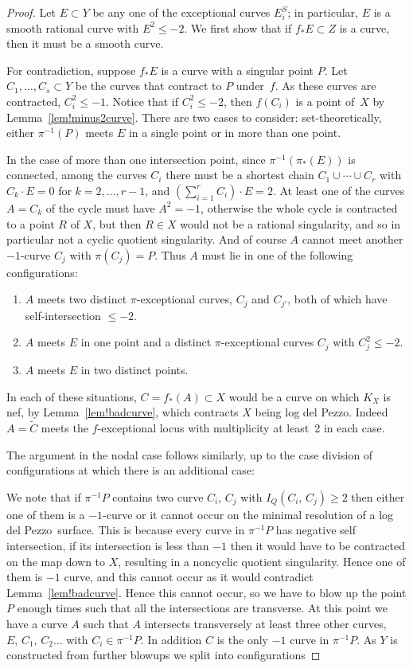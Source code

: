 \documentclass[11pt]{amsbook}
\theoremstyle{plain}
\newcommand{\ldp}{log del Pezzo}
\newcommand{\wt}[1]{\widetilde #1}
\begin{document}
\begin{proof}
Let $E\subset Y$ be any one of the exceptional curves $E_i^S$; in particular, $E$ is
a smooth rational curve with $E^2 \le-2$.
We first show that if $f_* E\subset Z$ is a curve, then it must be a smooth curve. 

For contradiction, suppose $f_*E$ is a curve with a singular point $P$.
Let $C_1,\dots,C_s\subset Y$ be the curves that contract to $P$ under~$f$.
As these curves are contracted, $C_i^2 \leq  -1$.
Notice that if $C_i^2\le-2$, then $f(C_i)$ is a point of~$X$
by Lemma~\ref{lem!minus2curve}.
There are two cases to consider: set-theoretically, either
$\pi^{-1}(P)$ meets $E$ in a single point or in more than one point.


In the case of more than one intersection point, since $\pi^{-1}(\pi_*(E))$ is connected,
among the curves $C_i$ there must be a shortest chain $C_1\cup\cdots\cup C_r$
with $C_k\cdot E=0$ for $k=2,\dots,r-1$, and $\left(\sum_{i=1}^r C_i\right)\cdot E = 2$.
At least one of the curves $A=C_k$ of the cycle must have $A^2=-1$, otherwise the
whole cycle is contracted to a point $R$ of $X$, but then $R\in X$ would not be
a rational singularity, and so in particular not a cyclic quotient singularity.
And of course $A$ cannot meet another $-1$-curve $C_j$ with $\pi(C_j)=P$.
Thus $A$ must lie in one of the following configurations:
\begin{enumerate}
\item
$A$ meets two distinct $\pi$-exceptional curves, $C_j$ and $C_{j'}$,
both of which have self-intersection $\le-2$.
\item
$A$ meets $E$ in one point and a distinct $\pi$-exceptional curves $C_j$
with $C_j^2\le-2$.
\item
$A$ meets $E$ in two distinct points.
\end{enumerate}
In each of these situations, $C = f_*(A)\subset X$ would be a curve
on which $K_X$ is nef, by Lemma~\ref{lem!badcurve}, which contracts
$X$ being \ldp. Indeed $A = \wt C$ meets the $f$-exceptional locus with multiplicity
at least~2 in each case.

The argument in the nodal case follows similarly, up to the case division of configurations
at which there is an additional case:

We note that if $\pi^{-1}{P}$ contains two curve $C_i$, $C_j$ with $I_Q (C_i, \, C_j) \ge 2$ then either one of them is a $-1$-curve or it cannot occur on the minimal resolution of a \ldp\ surface. This is because every curve in $\pi^{-1}{P}$ has negative self intersection, if its intersection is less than $-1$ then it would have to be contracted on the map down to $X$, resulting in a noncyclic quotient singularity. Hence one of them is $-1$ curve, and this cannot occur as it would contradict Lemma~\ref{lem!badcurve}. Hence this cannot occur, so we have to blow up the point $P$ enough times such that all the intersections are transverse. At this point we have a curve $A$ such that $A$ intersects transversely at least three other curves, $E, \, C_1, \, C_2 \dots $ with $C_i \in \pi^{-1} {P}$. In addition $C$ is the only $-1$ curve in $\pi^{-1}{P}$. As $Y$ is constructed from further blowups we split into configurations 


\end{proof}
\end{document}
